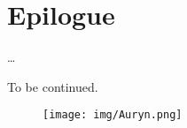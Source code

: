 \documentclass{article}
\begin{document}

\section*{Epilogue}

\dots


{\centering
\vspace{1 cm}
  \Huge To be continued.\par


\begin{figure}[h]
    \centering
    \texttt{[image: img/Auryn.png]}
\end{figure}

}





\newpage
\printbibliography
\end{document}
